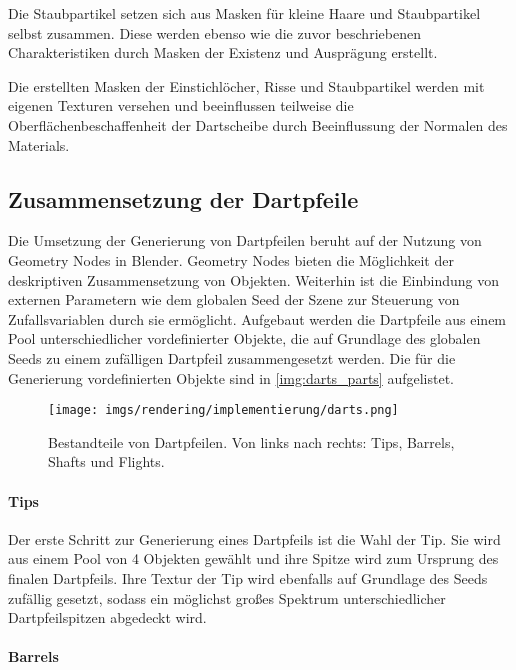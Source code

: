 Die Staubpartikel setzen sich aus Masken für kleine Haare und Staubpartikel selbst zusammen. Diese werden ebenso wie die zuvor beschriebenen Charakteristiken durch Masken der Existenz und Ausprägung erstellt.

\vspace{\baselineskip}

Die erstellten Masken der Einstichlöcher, Risse und Staubpartikel werden mit eigenen Texturen versehen und beeinflussen teilweise die Oberflächenbeschaffenheit der Dartscheibe durch Beeinflussung der Normalen des Materials.

\subsection{Zusammensetzung der Dartpfeile}  %
\label{sec:dartpfeile_zusammensetzung}

Die Umsetzung der Generierung von Dartpfeilen beruht auf der Nutzung von Geometry Nodes in Blender. Geometry Nodes bieten die Möglichkeit der deskriptiven Zusammensetzung von Objekten. Weiterhin ist die Einbindung von externen Parametern wie dem globalen Seed der Szene zur Steuerung von Zufallsvariablen durch sie ermöglicht. Aufgebaut werden die Dartpfeile aus einem Pool unterschiedlicher vordefinierter Objekte, die auf Grundlage des globalen Seeds zu einem zufälligen Dartpfeil zusammengesetzt werden. Die für die Generierung vordefinierten Objekte sind in \autoref{img:darts_parts} aufgelistet.

\begin{figure}
    \centering
    \texttt{[image: imgs/rendering/implementierung/darts.png]}
    \caption{Bestandteile von Dartpfeilen. Von links nach rechts: Tips, Barrels, Shafts und Flights.}
    \label{img:darts_parts}
\end{figure}

\paragraph{Tips}

Der erste Schritt zur Generierung eines Dartpfeils ist die Wahl der Tip. Sie wird aus einem Pool von 4 Objekten gewählt und ihre Spitze wird zum Ursprung des finalen Dartpfeils. Ihre Textur der Tip wird ebenfalls auf Grundlage des Seeds zufällig gesetzt, sodass ein möglichst großes Spektrum unterschiedlicher Dartpfeilspitzen abgedeckt wird.

\paragraph{Barrels}

